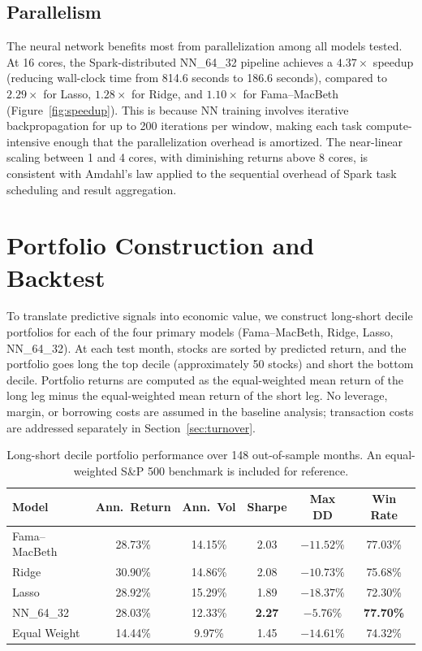 \documentclass[11pt]{article}
\begin{document}
\subsection{Parallelism}

The neural network benefits most from parallelization among all models tested. At 16 cores, the Spark-distributed NN\_64\_32 pipeline achieves a $4.37\times$ speedup (reducing wall-clock time from 814.6 seconds to 186.6 seconds), compared to $2.29\times$ for Lasso, $1.28\times$ for Ridge, and $1.10\times$ for Fama--MacBeth (Figure~\ref{fig:speedup}). This is because NN training involves iterative backpropagation for up to 200 iterations per window, making each task compute-intensive enough that the parallelization overhead is amortized. The near-linear scaling between 1 and 4 cores, with diminishing returns above 8 cores, is consistent with Amdahl's law applied to the sequential overhead of Spark task scheduling and result aggregation.

\section{Portfolio Construction and Backtest}
\label{sec:portfolio}

To translate predictive signals into economic value, we construct long-short decile portfolios for each of the four primary models (Fama--MacBeth, Ridge, Lasso, NN\_64\_32). At each test month, stocks are sorted by predicted return, and the portfolio goes long the top decile (approximately 50 stocks) and short the bottom decile. Portfolio returns are computed as the equal-weighted mean return of the long leg minus the equal-weighted mean return of the short leg. No leverage, margin, or borrowing costs are assumed in the baseline analysis; transaction costs are addressed separately in Section~\ref{sec:turnover}.

\begin{table}[H]
\centering
\caption{Long-short decile portfolio performance over 148 out-of-sample months. An equal-weighted S\&P 500 benchmark is included for reference.}
\label{tab:portfolio}
\begin{tabular}{lccccc}
\toprule
Model & Ann.\ Return & Ann.\ Vol & Sharpe & Max DD & Win Rate \\
\midrule
Fama--MacBeth & 28.73\% & 14.15\% & 2.03 & $-11.52\%$ & 77.03\% \\
Ridge         & 30.90\% & 14.86\% & 2.08 & $-10.73\%$ & 75.68\% \\
Lasso         & 28.92\% & 15.29\% & 1.89 & $-18.37\%$ & 72.30\% \\
NN\_64\_32    & 28.03\% & 12.33\% & \textbf{2.27} & $\mathbf{-5.76\%}$ & \textbf{77.70\%} \\
\midrule
Equal Weight  & 14.44\% & 9.97\%  & 1.45 & $-14.61\%$ & 74.32\% \\
\bottomrule
\end{tabular}
\end{table}
\end{document}
